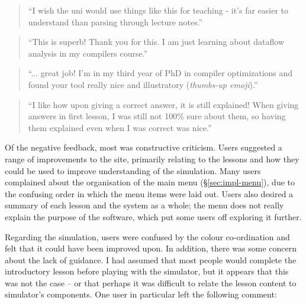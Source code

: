\documentclass[bsc,twoside,singlespacing,parskip,logo,notimes,normalheadings]{infthesis}
\begin{document}
    \begin{quote}
      \vspace{1mm}
      ``I wish the uni would use things like this for teaching - it's
      far easier to understand than parsing through lecture notes.''
      \vspace{1mm}
    \end{quote}

    \begin{quote}
      \vspace{1mm}
      ``This is superb! Thank you for this. I am just learning about
      dataflow analysis in my compilers course.''
      \vspace{1mm}
    \end{quote}

    \begin{quote}
      \vspace{1mm}
      ``... great job! I'm in my third year of PhD in compiler
      optimizations and found your tool really nice and illustratory
      ({\em thumbs-up emoji}).''
      \vspace{1mm}
    \end{quote}
    
    \begin{quote}
      \vspace{1mm}
      ``I like how upon giving a correct answer, it is still explained!
      When giving answers in first lesson, I was still not 100\% sure
      about them, so having them explained even when I was correct was
      nice.''
      \vspace{1mm}
    \end{quote}

    Of the negative feedback, most was constructive criticism. Users
    suggested a range of improvements to the site, primarily relating
    to the lessons and how they could be used to improve understanding
    of the simulation. Many users complained about the organisation of
    the main menu (\S\ref{sec:impl-menu}), due to the confusing order
    in which the menu items were laid out. Users also desired a
    summary of each lesson and the system as a whole; the menu does
    not really explain the purpose of the software, which put some
    users off exploring it further.

    Regarding the simulation, users were confused by the colour
    co-ordination and felt that it could have been improved upon. In
    addition, there was some concern about the lack of guidance. I had
    assumed that most people would complete the introductory lesson
    before playing with the simulator, but it appears that this was
    not the case -- or that perhaps it was difficult to relate the
    lesson content to simulator's components. One user in particular
    left the following comment:
\end{document}
